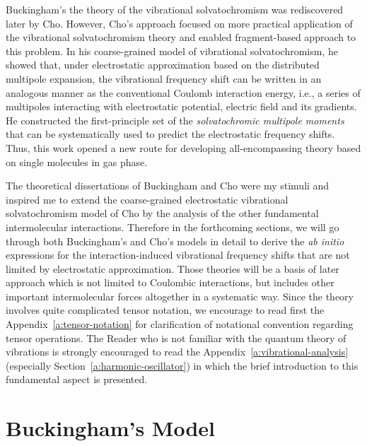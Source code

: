 \documentclass[a4paper,titlepage,twoside,fleqn,12pt]{book}
\begin{document}
\begin{refsection}
Buckingham's the theory of the vibrational solvatochromism was rediscovered later 
by Cho. \citep{Cho.JCP.2003,Cho.JCP.2009} 
However, Cho's 
approach focused on more practical application of the vibrational solvatochromism 
theory and enabled fragment\hyp{}based approach to this problem. In his coarse\hyp{}grained
model of vibrational solvatochromism, he showed that,
under electrostatic approximation based on the distributed multipole expansion, 
the vibrational frequency shift can be written in an analogous manner as the conventional
Coulomb interaction energy, i.e., a series of multipoles interacting with
electrostatic potential, electric field and its gradients. 
He constructed the first\hyp{}principle set of 
the \emph{solvatochromic multipole moments} that can be systematically used
to predict the electrostatic frequency shifts. Thus, this work opened a new route for developing
all\hyp{}encompassing theory based on single molecules in gas phase.

The theoretical dissertations of Buckingham and Cho were my stimuli and inspired
me to extend the coarse\hyp{}grained electrostatic vibrational solvatochromism 
model of Cho by the analysis of the other fundamental intermolecular interactions.
Therefore in the forthcoming sections, we will go through both Buckingham's and Cho's
models in detail
to derive the \emph{ab initio} expressions for the interaction\hyp{}induced 
vibrational frequency shifts that are not limited by electrostatic approximation.
Those theories will be a basis of later approach which is not limited to
Coulombic interactions, but includes other important intermolecular forces altogether
in a systematic way. Since the theory involves quite complicated
tensor notation, we encourage to read first the Appendix~\ref{a:tensor-notation}
for clarification of notational convention regarding tensor operations.
The Reader who is not familiar with the quantum theory of vibrations is strongly encouraged
to read the Appendix~\ref{a:vibrational-analysis} 
(especially Section~\ref{a:harmonic-oscillator})
in which the brief introduction to this fundamental aspect is presented.

\section{Buckingham's Model  \label{s:buckingham-theory}}


\end{refsection}
\end{document}
